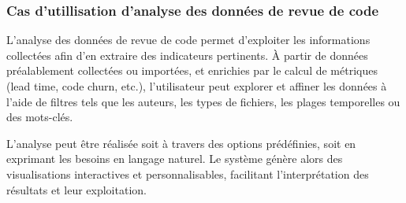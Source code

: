 \subsubsection*{Cas d'utillisation d'analyse des données de revue de code}

L’analyse des données de revue de code permet d’exploiter les informations collectées afin d’en extraire des indicateurs pertinents. À partir de données préalablement collectées ou importées, et enrichies par le calcul de métriques (lead time, code churn, etc.), l’utilisateur peut explorer et affiner les données à l’aide de filtres tels que les auteurs, les types de fichiers, les plages temporelles ou des mots-clés.

L’analyse peut être réalisée soit à travers des options prédéfinies, soit en exprimant les besoins en langage naturel. Le système génère alors des visualisations interactives et personnalisables, facilitant l’interprétation des résultats et leur exploitation.

